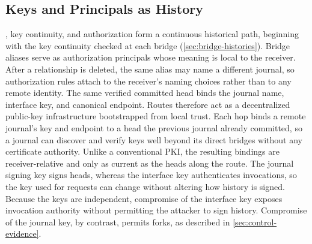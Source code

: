 \begin{table}[htbp]
  \centering
  \small
  
  \caption{Public Resource Operations}
  \label{tab:resource-operations}
\end{table}

\subsection{Keys and Principals as History}
\label{sec:keys-principals}

, key continuity, and authorization form a continuous historical path, beginning with the key continuity checked at each bridge (\cref{sec:bridge-histories}). Bridge aliases serve as authorization principals whose meaning is local to the receiver. After a relationship is deleted, the same alias may name a different journal, so authorization rules attach to the receiver's naming choices rather than to any remote identity. The same verified committed head binds the journal name, interface key, and canonical endpoint. Routes therefore act as a decentralized public-key infrastructure bootstrapped from local trust. Each hop binds a remote journal's key and endpoint to a head the previous journal already committed, so a journal can discover and verify keys well beyond its direct bridges without any certificate authority. Unlike a conventional PKI, the resulting bindings are receiver-relative and only as current as the heads along the route. The journal signing key signs heads, whereas the interface key authenticates invocations, so the key used for requests can change without altering how history is signed. Because the keys are independent, compromise of the interface key exposes invocation authority without permitting the attacker to sign history. Compromise of the journal key, by contrast, permits forks, as described in \cref{sec:control-evidence}.

